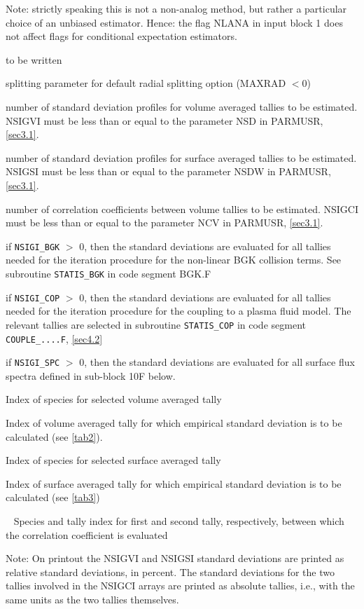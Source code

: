\begin{description}
        Note: strictly speaking this is not a non-analog method, but rather a particular choice of an unbiased estimator.
        Hence: the flag NLANA in input block 1 does not affect flags for conditional expectation estimators.
  \item[WMINL] to be written 

  \item[SPLPAR] splitting parameter for default radial splitting option (MAXRAD $<0$)
  \item[NSIGVI] number of standard deviation profiles for volume averaged tallies to be estimated.
        NSIGVI must be less than or equal to the parameter NSD in PARMUSR, \cref{sec3.1}.
  \item[NSIGSI] number of standard deviation profiles for surface averaged tallies to be estimated.
        NSIGSI must be less than or equal to the parameter NSDW in PARMUSR, \cref{sec3.1}.
  \item[NSIGCI] number of correlation coefficients between volume tallies to be estimated.
        NSIGCI must be less than or equal to the parameter NCV in PARMUSR, \cref{sec3.1}.
  \item[NSIGI\_BGK] if \lstinline|NSIGI_BGK| $>$ 0, then the standard deviations are evaluated for all tallies needed for the iteration procedure for the non-linear \ac{BGK} collision terms.
        See subroutine \lstinline|STATIS_BGK| in code segment BGK.F
  \item[NSIGI\_COP] if \lstinline|NSIGI_COP| $>$ 0, then the standard deviations are evaluated for all tallies needed for the iteration procedure for the coupling to a plasma fluid model.
        The relevant tallies are selected in subroutine \lstinline|STATIS_COP| in code segment \lstinline|COUPLE_....F|, \cref{sec4.2}
  \item[NSIGI\_SPC] if \lstinline|NSIGI_SPC| $>$ 0, then the standard deviations are evaluated for all surface flux spectra defined in sub-block 10F below.
  \item[IGH] Index of species for selected volume averaged tally
  \item[IIH] Index of volume averaged tally for which empirical standard deviation is to be calculated (see \cref{tab2}).
  \item[IGHW] Index of species for selected surface averaged tally
  \item[IIHW] Index of surface averaged tally for which empirical standard deviation is to be calculated (see \cref{tab3})
  \item[IGHC1 IIHC1 IGHC2 IIHC2]~ Species and tally index for first and second tally, respectively, between which the correlation coefficient is evaluated
\end{description}

Note: On printout the NSIGVI and NSIGSI standard deviations are printed as relative standard deviations, in percent.
The standard deviations for the two tallies involved in the NSIGCI arrays are printed as absolute tallies, i.e., with the same units as the two tallies themselves.
